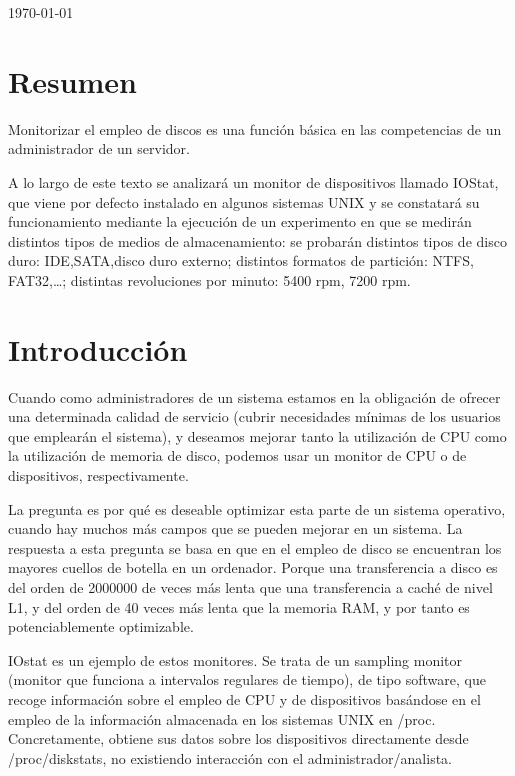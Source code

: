 \documentclass[a4paper,10pt]{article}
\newcommand{\imagent}[5]{
  \begin{figure}
    \begin{center}
    \texttt{[image: \#1]}
    \end{center}
    \caption{#3}
    \label{#4}
  \end{figure}
}
\newcommand{\imagen}[4]{
  \begin{minipage}{\linewidth}
    \centering
    \texttt{[image: \#1]}
    \captionof{figure}{#2}
    \label{#3}
  \end{minipage} 
}
\renewcommand{\texttt}[2][black!60]{\textcolor{#1}{\ttfamily #2}}
\begin{document}
\begin{titlepage}
\vspace{\fill}%
\large\today
\end{titlepage}  

\newpage
\thispagestyle{empty}
\tableofcontents
\newpage
\setcounter{page}{1}


\section{Resumen}
Monitorizar el empleo de discos es una función básica en las competencias de un administrador de un servidor.

A lo largo de este texto se analizará un monitor de dispositivos llamado IOStat, que viene por defecto instalado
en algunos sistemas UNIX y se constatará su funcionamiento mediante la ejecución de un experimento en que se medirán distintos tipos de medios 
de almacenamiento: se probarán distintos tipos de disco
duro: IDE,SATA,disco duro externo; distintos formatos de partición: NTFS, FAT32,\ldots; distintas revoluciones por minuto: 5400 rpm, 7200 rpm.
\section{Introducción}
Cuando como administradores de un sistema estamos en la obligación de ofrecer una determinada calidad de servicio (cubrir
necesidades mínimas de los usuarios que emplearán el sistema), y deseamos mejorar tanto la utilización de CPU como la utilización de 
memoria de disco, podemos usar un monitor de CPU o de dispositivos, respectivamente.

La pregunta es por qué es deseable optimizar esta parte de un sistema operativo, cuando hay muchos más campos que se pueden
mejorar en un sistema. La respuesta a esta pregunta se basa en que en el empleo de disco se encuentran los mayores cuellos de
botella en un ordenador. Porque una transferencia a  disco es del orden de 2000000 de veces más lenta que una transferencia a
caché de nivel L1, y del orden de 40 veces más lenta que la memoria RAM, y por tanto es potenciablemente optimizable. \cite{conferencia}

IOstat es un ejemplo de estos monitores. Se trata de un sampling monitor (monitor que funciona a intervalos regulares de
tiempo), de tipo software, que recoge información sobre el empleo de CPU y de dispositivos basándose en el empleo de la información almacenada
en los sistemas UNIX en \texttt{/proc}. Concretamente, obtiene sus datos sobre los dispositivos directamente desde
\texttt{/proc/diskstats}, no existiendo interacción con el administrador/analista. 
\end{document}
